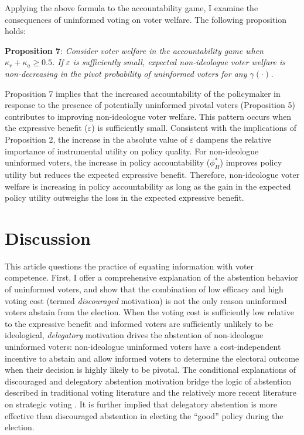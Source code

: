 \documentclass[doc,natbib,12pt]{apa6}
\begin{document}
	\par Applying the above formula to the accountability game, I examine the consequences of uninformed voting on voter welfare. The following proposition holds:
	
	\noindent \textbf{Proposition 7}: \textit{Consider voter welfare in the accountability game when $\kappa_{r} + \kappa_{a} \geq 0.5$. If $\varepsilon$ is sufficiently small, expected non-ideologue voter welfare is non-decreasing in the pivot probability of uninformed voters for any $\gamma(\cdot)$.}
	
	\noindent Proposition 7 implies that the increased accountability of the policymaker in response to the presence of potentially uninformed pivotal voters (Proposition 5) contributes to improving non-ideologue voter welfare. This pattern occurs when the expressive benefit ($\varepsilon$) is sufficiently small. Consistent with the implications of Proposition 2, the increase in the absolute value of $\varepsilon$ dampens the relative importance of instrumental utility on policy quality. For non-ideologue uninformed voters, the increase in policy accountability ($\phi^*_H$) improves policy utility but reduces the expected expressive benefit. Therefore, non-ideologue voter welfare is increasing in policy accountability as long as the gain in the expected policy utility outweighs the loss in the expected expressive benefit. 
	
	\section{Discussion}
	
	\par This article questions the practice of equating information with voter competence. First, I offer a comprehensive explanation of the abstention behavior of uninformed voters, and show that the combination of low efficacy and high voting cost (termed \textit{discouraged} motivation) is not the only reason uninformed voters abstain from the election. When the voting cost is sufficiently low relative to the expressive benefit and informed voters are sufficiently unlikely to be ideological, \textit{delegatory} motivation drives the abstention of non-ideologue uninformed voters: non-ideologue uninformed voters have a cost-independent incentive to abstain and allow informed voters to determine the electoral outcome when their decision is highly likely to be pivotal. The conditional explanations of discouraged and delegatory abstention motivation bridge the logic of abstention described in traditional voting literature \citep{Downs1957anec, Riker1968thof, Matsusaka1995exvo} and the relatively more recent literature on strategic voting \citep{Feddersen1996thsw, Feddersen1999abin}. It is further implied that delegatory abstention is more effective than discouraged abstention in electing the ``good'' policy during the election.
	
\end{document}
